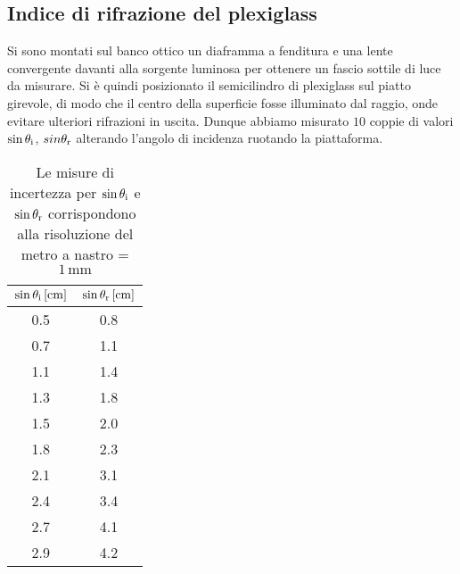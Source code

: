\documentclass{article}[a4paper,11pt]
\begin{document}
\subsection*{Indice di rifrazione del plexiglass}
Si sono montati sul banco ottico un diaframma a fenditura e una lente convergente davanti alla sorgente luminosa per ottenere un fascio sottile di luce da misurare. Si \`e quindi posizionato il semicilindro di plexiglass sul piatto girevole, di modo che il centro della superficie fosse illuminato dal raggio, onde evitare ulteriori rifrazioni in uscita. Dunque abbiamo misurato $10$ coppie di valori $\sin\theta_{\rm i}$, $sin\theta_{\rm r}$ alterando l'angolo di incidenza ruotando la piattaforma.

\begin{table}[H]
  \begin{center}
	\begin{tabular}{cc}
	\toprule
	$\sin\theta_{\rm i} \, [\si{\cm}]$ & $\sin\theta_{\rm r} \, [\si{\cm}]$ \\
	\midrule
	\midrule
	0.5	&	0.8	\\
	0.7	&	1.1	\\
	1.1	&	1.4	\\
	1.3	&	1.8	\\
	1.5	&	2.0	\\	
	1.8	&	2.3 \\		
	2.1	&	3.1	\\	
	2.4	&	3.4	\\	
	2.7	&	4.1	\\	
	2.9	&	4.2 \\
	\bottomrule
	\end{tabular}
  \end{center}
  \caption{Le misure di incertezza per $\sin\theta_{\rm i}$ e $\sin\theta_{\rm r}$ corrispondono alla risoluzione del metro a nastro =  $1 \, \si{\mm}$ \label{tab:plex}}
\end{table}
\end{document}
